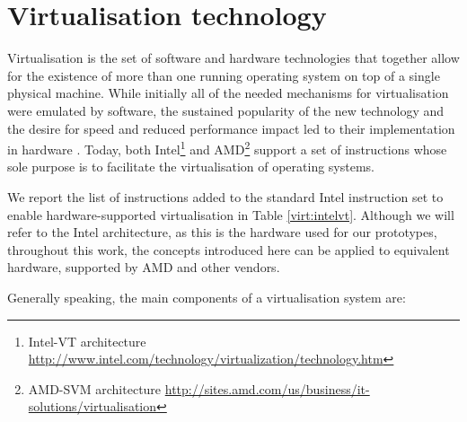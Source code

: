 
\section{Virtualisation technology} \label{virt:tech}
Virtualisation is the set of software and hardware technologies that together allow for the existence of more than one running operating system on top of a single physical machine. While initially all of the needed mechanisms for virtualisation were emulated by software, the sustained popularity of the new technology and the desire for speed and reduced performance impact led to their implementation in hardware \cite{softhard, Uhlig:2005:IVT:1069588.1069634}. Today, both Intel\footnote{Intel-VT architecture \url{http://www.intel.com/technology/virtualization/technology.htm}} and AMD\footnote{AMD-SVM architecture \url{http://sites.amd.com/us/business/it-solutions/virtualisation}} support a set of instructions whose sole purpose is to facilitate the virtualisation of operating systems. %

We report the list of instructions added to the standard Intel instruction set to enable hardware-supported virtualisation in Table \ref{virt:intelvt}.
Although we will refer to the Intel architecture, as this is the hardware used for our prototypes, throughout this work, the concepts introduced here can be applied to equivalent hardware, supported by AMD and other vendors.


Generally speaking, the main components of a virtualisation system are:

